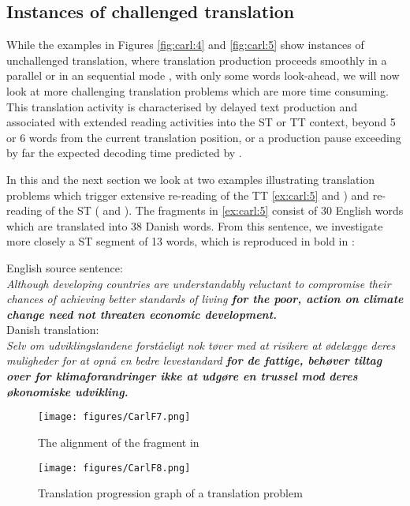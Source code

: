 \documentclass[output=paper]{LSP/langsci}
\begin{document}
\subsection{Instances of challenged translation}\label{sec:carl:4.3}
\largerpage
While the examples in Figures \ref{fig:carl:4} and \ref{fig:carl:5} show instances of unchallenged translation, where translation production proceeds smoothly in a parallel  or in an sequential mode , with only some words look-ahead, we will now look at more challenging translation problems which are more time consuming. This translation activity is characterised by delayed text production and associated with extended reading activities into the ST or TT context, beyond 5 or 6 words from the current translation position, or a production pause exceeding by far the expected decoding time predicted by \citeauthor{John1996}.

In this and the next section we look at two examples illustrating translation problems which trigger extensive re-reading of the TT \ref{ex:carl:5} and ) and re-reading of the ST ( and ). The fragments in \ref{ex:carl:5} consist of 30 English words which are translated into 38 Danish words. From this sentence, we investigate more closely a ST segment of 13 words, which is reproduced in bold in :

\ea\label{ex:carl:5}
English source sentence:\\
\textit{Although developing countries are understandably reluctant to compromise their chances of achieving better standards of living \textbf{for the poor, action on climate change need not threaten economic development.}}\\
Danish translation:\\
\textit{Selv om udviklingslandene forståeligt nok tøver med at risikere at ødelægge deres muligheder for at opnå en bedre levestandard  \textbf{for de fattige, behøver tiltag over for klimaforandringer ikke at udgøre en trussel mod deres økonomiske udvikling.}}\\
\z

\begin{figure}
\texttt{[image: figures/CarlF7.png]}
\caption{The alignment of the fragment in }
\label{fig:carl:7}
\end{figure} 

\begin{figure}
\texttt{[image: figures/CarlF8.png]}
\caption{Translation progression graph of a translation problem}
\label{fig:carl:8}
\end{figure} 
\end{document}
